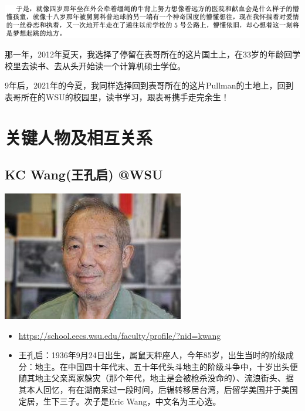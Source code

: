 \documentclass[9pt, b5paper]{article}
\begin{document}
\begin{center}
\includegraphics[width=.9\linewidth]{./pic/backups_plans_20210414_161940.png}
\end{center}

那一年，2012年夏天，我选择了停留在表哥所在的这片国土上，在33岁的年龄回学校里去读书、去从头开始读一个计算机硕士学位。

9年后，2021年的今夏，我同样选择回到表哥所在的这片Pullman的土地上，回到表哥所在的WSU的校园里，读书学习，跟表哥携手走完余生！


\section{关键人物及相互关系}
\label{sec:org6c5168f}
\subsection{KC Wang(王孔启) @WSU}
\label{sec:orgc8408ea}

\begin{center}
\includegraphics[width=.9\linewidth]{./pic/KCWang.jpg}
\end{center}
\begin{itemize}
\item \url{https://school.eecs.wsu.edu/faculty/profile/?nid=kwang}
\item 王孔启：1936年9月24日出生，属鼠天秤座人，今年85岁，出生当时的阶级成分：地主。在中国四十年代末、五十年代头斗地主的阶级斗争中，十岁出头便随其地主父亲离家躲灾（那个年代，地主是会被枪杀没命的）、流浪街头、据其本人回忆，有在湖南呆过一段时间，后辗转移居台湾，后留学美国并于美国定居，生下三子。次子是Eric Wang，中文名为王心选。
\end{itemize}
\end{document}
